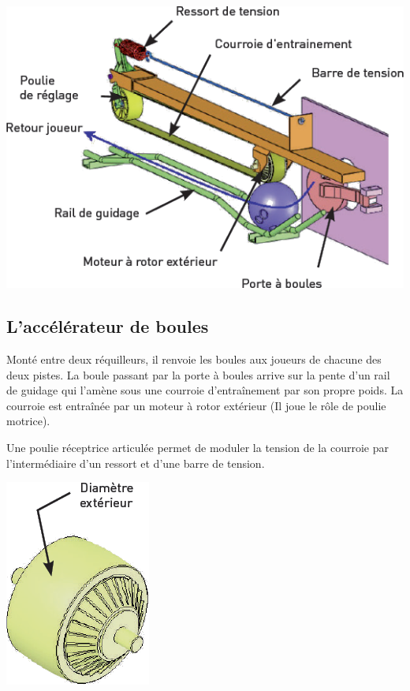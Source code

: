 \documentclass[10pt,fleqn]{article} %
\begin{document}
\begin{multicols}{2}
\begin{center}
\includegraphics[width=\linewidth]{images/fig_02}
\end{center}


\subsection*{L'accélérateur de boules}

Monté entre deux réquilleurs, il renvoie les boules aux joueurs de chacune des deux pistes. La boule passant par la porte à boules arrive sur la pente d'un rail de guidage qui l'amène sous une courroie d'entraînement par son propre poids. La courroie est entraînée par un moteur à rotor extérieur (Il joue le rôle de poulie motrice).

Une poulie réceptrice articulée permet de moduler la tension de la courroie par l'intermédiaire d'un ressort et d'une barre de tension.


\begin{center}
\includegraphics[width=.5\linewidth]{images/fig_03}


\end{center}
\end{multicols}
\end{document}
